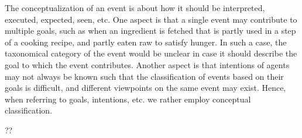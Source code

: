 The conceptualization of an event is about how it should be interpreted, executed, expected, seen, etc.
One aspect is that a single event may contribute to multiple goals, such as when an ingredient is fetched that is partly used in a step of a cooking recipe, and partly eaten raw to satisfy hunger.
In such a case, the taxonomical category of the event would be unclear in case it should describe the goal to which the event contributes.
Another aspect is that intentions of agents may not always be known such that the classification of events based on their goals is difficult, and different viewpoints on the same event may exist.
Hence, when referring to goals, intentions, etc. we rather employ conceptual classification.

\begin{ODP}{??}
\end{ODP}



